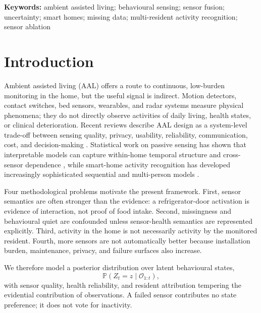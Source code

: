\documentclass[11pt]{article}
\newcommand{\Prob}{\mathbb{P}}
\newcommand{\calO}{\mathcal{O}}
\begin{document}
\noindent\textbf{Keywords:} ambient assisted living; behavioural sensing; sensor fusion; uncertainty; smart homes; missing data; multi-resident activity recognition; sensor ablation

\section{Introduction}

Ambient assisted living (AAL) offers a route to continuous, low-burden monitoring in the home, but the useful signal is indirect. Motion detectors, contact switches, bed sensors, wearables, and radar systems measure physical phenomena; they do not directly observe activities of daily living, health states, or clinical deterioration. Recent reviews describe AAL design as a system-level trade-off between sensing quality, privacy, usability, reliability, communication, cost, and decision-making \citep{zieni2025aal}. Statistical work on passive sensing has shown that interpretable models can capture within-home temporal structure and cross-sensor dependence \citep{gillam2022athome}, while smart-home activity recognition has developed increasingly sophisticated sequential and multi-person models \citep{asghari2019hhmm,wang2022multiperson}.

Four methodological problems motivate the present framework. First, sensor semantics are often stronger than the evidence: a refrigerator-door activation is evidence of interaction, not proof of food intake. Second, missingness and behavioural quiet are confounded unless sensor-health semantics are represented explicitly. Third, activity in the home is not necessarily activity by the monitored resident. Fourth, more sensors are not automatically better because installation burden, maintenance, privacy, and failure surfaces also increase.

We therefore model a posterior distribution over latent behavioural states,
\begin{equation}
\Prob(Z_t=z\mid\calO_{1:t}),
\end{equation}
with sensor quality, health reliability, and resident attribution tempering the evidential contribution of observations. A failed sensor contributes no state preference; it does not vote for inactivity.
\end{document}
